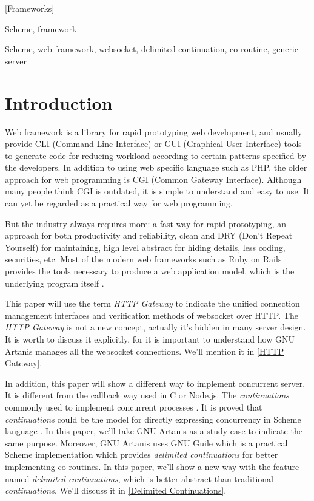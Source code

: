 \documentclass[numbers,numberedpars]{sigplanconf}
\begin{document}
[Frameworks]

\terms
Scheme, framework

\keywords
Scheme, web framework, websocket, delimited continuation, co-routine, generic server

\section{Introduction}

Web framework is a library for rapid prototyping web development, and usually provide CLI (Command Line Interface) or
GUI (Graphical User Interface) tools to generate code for reducing workload according to certain patterns specified by the developers.
In addition to using web specific language such as PHP, the older approach for web programming is CGI (Common Gateway Interface).
Although many people think CGI is outdated, it is simple to understand and easy to use.
It can yet be regarded as a practical way for web programming.

But the industry always requires more: a fast way for rapid prototyping, an approach for both productivity and reliability, clean and DRY
(Don't Repeat Yourself) for maintaining, high level abstract for hiding details, less coding, securities, etc.
Most of the modern web frameworks such as Ruby on Rails provides the tools necessary to produce a web application model,
which is the underlying program itself \citep{1597080}. 

This paper will use the term {\it HTTP Gateway} to indicate the unified connection management interfaces and verification methods of websocket
over HTTP. The {\it HTTP Gateway} is not a new concept, actually it's hidden in many server design. It is worth to discuss it explicitly,
for it is important to understand how GNU Artanis manages all the websocket connections. We'll mention it in \ref{HTTP Gateway}.

In addition, this paper will show a different way to implement concurrent server. It is different from the callback way used in C or Node.js.
The {\it continuations} commonly used to implement concurrent processes
\citep{Krishnamurthi2007}\citep{Hieb:1990:CC:99164.99178}\citep{Hieb:1994:SUB:184324.184330}.
It is proved that {\it continuations} could be the model for directly expressing concurrency in Scheme language \citep{shivers1997continuations}.
In this paper, we'll take GNU Artanis as a study case to indicate the same purpose. Moreover,
GNU Artanis uses GNU Guile which is a practical Scheme implementation which provides {\it delimited continuations} for better implementing co-routines.
In this paper, we'll show a new way with the feature named {\it delimited continuations}, which is better abstract than traditional {\it continuations}.
We'll discuss it in \ref{Delimited Continuations}.
\end{document}
